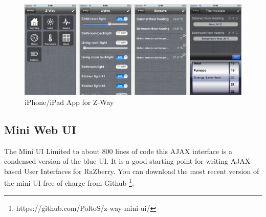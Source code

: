 \begin{figure} 
\begin{center}
\includegraphics[scale=0.3]{pics/ipad.png}
\caption{iPhone/iPad App for Z-Way}
\label{c2:demorouting} 
\end{center} 
\end{figure}

\subsection{Mini Web UI}

The Mini UI Limited to about 800 lines of code this AJAX interface is a condensed version of the blue UI. 
It is a good starting point for writing AJAX based User Interfaces for RaZberry. You can download the most 
recent version of the mini UI free of charge from Github \footnote {https://github.com/PoltoS/z-way-mini-ui/}.

